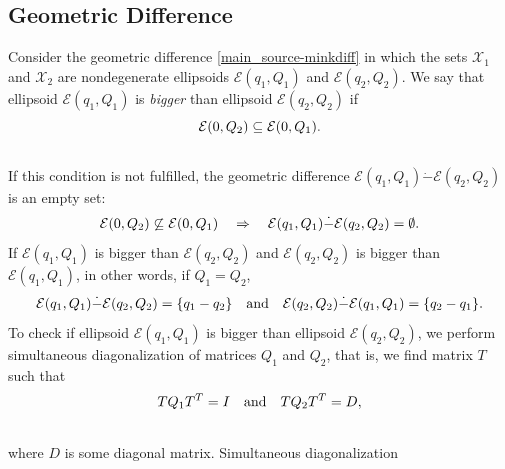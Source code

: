 \documentclass[letterpaper,10pt,english]{sphinxmanual}
\begin{document}
\subsection{Geometric Difference}
\label{main_source:geometric-difference}
Consider the geometric difference \eqref{main_source-minkdiff} in which the sets
${\mathcal X}_1$ and ${\mathcal X}_2$ are nondegenerate
ellipsoids ${\mathcal E}(q_1,Q_1)$ and
${\mathcal E}(q_2,Q_2)$. We say that ellipsoid
${\mathcal E}(q_1,Q_1)$ is \emph{bigger} than ellipsoid
${\mathcal E}(q_2,Q_2)$ if
\begin{gather}
\begin{split}{\mathcal E}(0,Q_2) \subseteq {\mathcal E}(0,Q_1).\end{split}\notag\\\begin{split}\end{split}\notag
\end{gather}
If this condition is not fulfilled, the geometric difference
${\mathcal E}(q_1,Q_1)\dot{-}{\mathcal E}(q_2,Q_2)$ is an empty
set:
\begin{gather}
\begin{split}{\mathcal E}(0,Q_2) \not\subseteq {\mathcal E}(0,Q_1) ~~~ \Rightarrow ~~~
{\mathcal E}(q_1,Q_1) \dot{-}{\mathcal E}(q_2,Q_2) = \emptyset.\end{split}\notag
\end{gather}
If ${\mathcal E}(q_1,Q_1)$ is bigger than
${\mathcal E}(q_2,Q_2)$ and ${\mathcal E}(q_2,Q_2)$ is
bigger than ${\mathcal E}(q_1,Q_1)$, in other words, if
$Q_1=Q_2$,
\begin{gather}
\begin{split}{\mathcal E}(q_1,Q_1) \dot{-}{\mathcal E}(q_2,Q_2) = \{q_1-q_2\} ~~~ \mbox{and} ~~~
{\mathcal E}(q_2,Q_2) \dot{-}{\mathcal E}(q_1,Q_1) = \{q_2-q_1\}.\end{split}\notag
\end{gather}
To check if ellipsoid ${\mathcal E}(q_1,Q_1)$ is bigger than
ellipsoid ${\mathcal E}(q_2,Q_2)$, we perform simultaneous
diagonalization of matrices $Q_1$ and $Q_2$, that is, we
find matrix $T$ such that
\begin{gather}
\begin{split}TQ_1T^T = I ~~~ \mbox{and} ~~~ TQ_2T^T=D,\end{split}\notag\\\begin{split}\end{split}\notag
\end{gather}
where $D$ is some diagonal matrix. Simultaneous diagonalization
\end{document}
